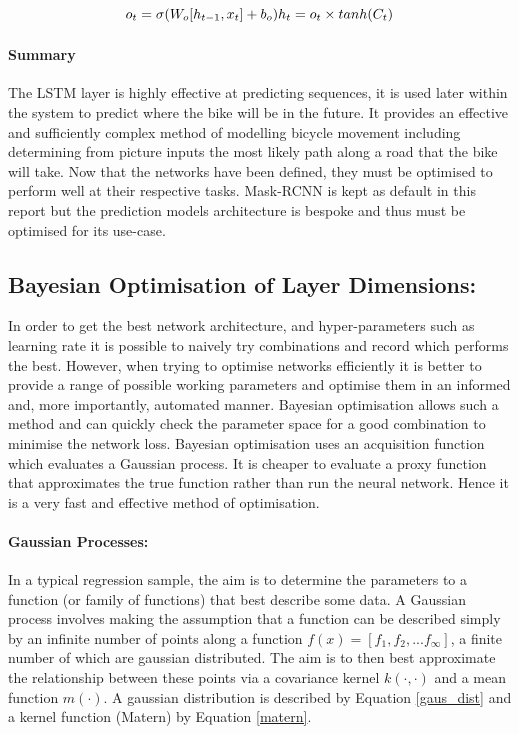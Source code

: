 \documentclass[11pt,twoside]{report}
\begin{document}
\begin{equation}
o_{t} = \sigma (W_{o}[h_{t-1},x_{t}] + b_{o}) \\
h_{t} = o_{t} \times tanh(C_{t})
\label{forget_gate}
\end{equation}

\paragraph{Summary}

The LSTM layer is highly effective at predicting sequences, it is used later within the system to predict where the bike will be in the future. It provides an effective and sufficiently complex method of modelling bicycle movement including determining from picture inputs the most likely path along a road that the bike will take. Now that the networks have been defined, they must be optimised to perform well at their respective tasks. Mask-RCNN is kept as default in this report but the prediction models architecture is bespoke and thus must be optimised for its use-case.
 
\subsection{Bayesian Optimisation of Layer Dimensions:}
In order to get the best network architecture, and hyper-parameters such as learning rate it is possible to naively try combinations and record which performs the best. However, when trying to optimise networks efficiently it is better to provide a range of possible working parameters and optimise them in an informed and, more importantly, automated manner. Bayesian optimisation allows such a method and can quickly check the parameter space for a good combination to minimise the network loss. Bayesian optimisation uses an acquisition function which evaluates a Gaussian process. It is cheaper to evaluate a proxy function that approximates the true function rather than run the neural network. Hence it is a very fast and effective method of optimisation.

\paragraph{Gaussian Processes:}
In a typical regression sample, the aim is to determine the parameters to a function (or family of functions) that best describe some data. A Gaussian process involves making the assumption that a function can be described simply by an infinite number of points along a function $f(x) = [f_{1},f_{2},...f_{\infty}]$, a finite number of which are gaussian distributed. The aim is to then best approximate the relationship between these points via a covariance kernel $k(\cdot,\cdot)$ and a mean function $m(\cdot)$. A gaussian distribution is described by Equation \ref{gaus_dist} and a kernel function (Matern) by Equation \ref{matern}.
\end{document}
